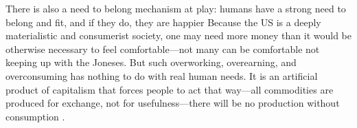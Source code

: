 \documentclass[10pt, letterpaper]{article}
\begin{document}
\begin{spacing}{1.8}
There is also a need to belong mechanism at play: humans have a strong need to
belong and fit, and if they do, they are happier%
 \citep{aokrel,aokditella} %
Because the US is a deeply materialistic and consumerist society, one may need more money than it would be otherwise necessary to feel comfortable---not
many can be comfortable not keeping up with the Joneses. But such overworking, overearning, and overconsuming has nothing to do with real human needs. It is an artificial
product of capitalism that forces people to act that way---all commodities are
produced for exchange, not for usefulness---there will be no production without
consumption \citep{marx1844-human-requirements}.%


\end{spacing}
\end{document}
